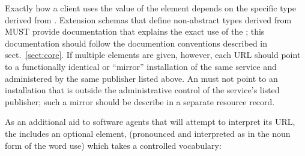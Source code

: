 \documentclass[11pt,a4paper]{ivoa}
\begin{document}
Exactly how a client uses the value
of the  element depends on the specific
type derived from .  Extension schemas that
define non-abstract types derived from  MUST
provide documentation that explains the exact use of the
; this documentation should follow the
documention conventions described in sect.~\ref{sect:core}.  If multiple
 elements are given, however, each URL should
point to a functionally identical or ``mirror'' installation of the same
service and administered by the same publisher listed above.  An
 must not point to an installation
that is outside the administrative control of the service's listed
publisher; such a mirror should be describe in a separate resource
record.  



As an additional aid to software agents that will attempt to interpret
its URL, the  includes an optional element,
 (pronounced and interpreted as in the noun form of
the word use) which takes a controlled vocabulary:
\end{document}
